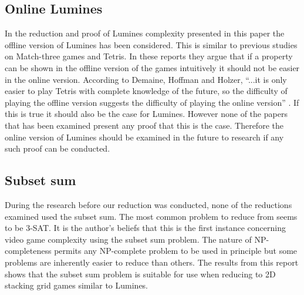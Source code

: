 \subsection{Online Lumines}

In the reduction and proof of Lumines complexity presented in this paper the offline version of Lumines has been considered. This is similar to previous studies on Match-three games and Tetris. In these reports they argue that if a property can be shown in the offline version of the games intuitively it should not be easier in the online version. According to Demaine, Hoffman and Holzer, ``...it is only easier to play Tetris with complete knowledge of the future, so the difficulty of playing the offline version suggests the difficulty of playing the online version'' \cite[p. 2]{tetris}. If this is true it should also be the case for Lumines. However none of the papers that has been examined present any proof that this is the case. Therefore the online version of Lumines should be examined in the future to research if any such proof can be conducted.

\subsection{Subset sum}

During the research before our reduction was conducted, none of the reductions examined used the subset sum. The most common problem to reduce from seems to be 3-SAT. It is the author's beliefs that this is the first instance concerning video game complexity using the subset sum problem. The nature of NP-completeness permits any NP-complete problem to be used in principle but some problems are inherently easier to reduce than others. The results from this report shows that the subset sum problem is suitable for use when reducing to 2D stacking grid games similar to Lumines. 
